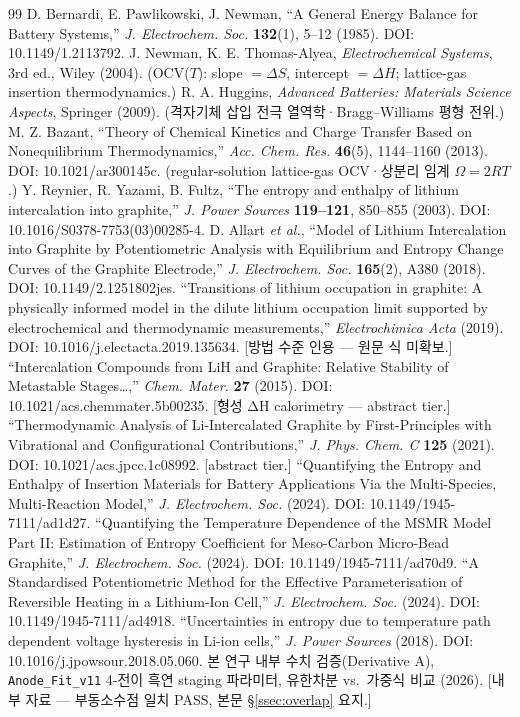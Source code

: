 \documentclass[11pt,a4paper]{article}
\begin{document}
\begin{thebibliography}{99}
 D. Bernardi, E. Pawlikowski, J. Newman, ``A General Energy Balance for Battery Systems,'' \emph{J. Electrochem. Soc.} \textbf{132}(1), 5--12 (1985). DOI: 10.1149/1.2113792.
 J. Newman, K. E. Thomas-Alyea, \emph{Electrochemical Systems}, 3rd ed., Wiley (2004). (OCV($T$): slope $=\Delta S$, intercept $=\Delta H$; lattice-gas insertion thermodynamics.)
 R. A. Huggins, \emph{Advanced Batteries: Materials Science Aspects}, Springer (2009). (격자기체 삽입 전극 열역학·Bragg--Williams 평형 전위.)
 M. Z. Bazant, ``Theory of Chemical Kinetics and Charge Transfer Based on Nonequilibrium Thermodynamics,'' \emph{Acc. Chem. Res.} \textbf{46}(5), 1144--1160 (2013). DOI: 10.1021/ar300145c. (regular-solution lattice-gas OCV·상분리 임계 $\Omega=2RT$.)
 Y. Reynier, R. Yazami, B. Fultz, ``The entropy and enthalpy of lithium intercalation into graphite,'' \emph{J. Power Sources} \textbf{119--121}, 850--855 (2003). DOI: 10.1016/S0378-7753(03)00285-4.
 D. Allart \emph{et al.}, ``Model of Lithium Intercalation into Graphite by Potentiometric Analysis with Equilibrium and Entropy Change Curves of the Graphite Electrode,'' \emph{J. Electrochem. Soc.} \textbf{165}(2), A380 (2018). DOI: 10.1149/2.1251802jes.
 ``Transitions of lithium occupation in graphite: A physically informed model in the dilute lithium occupation limit supported by electrochemical and thermodynamic measurements,'' \emph{Electrochimica Acta} (2019). DOI: 10.1016/j.electacta.2019.135634. [방법 수준 인용 — 원문 식 미확보.]
 ``Intercalation Compounds from LiH and Graphite: Relative Stability of Metastable Stages\ldots,'' \emph{Chem. Mater.} \textbf{27} (2015). DOI: 10.1021/acs.chemmater.5b00235. [형성 ΔH calorimetry — abstract tier.]
 ``Thermodynamic Analysis of Li-Intercalated Graphite by First-Principles with Vibrational and Configurational Contributions,'' \emph{J. Phys. Chem. C} \textbf{125} (2021). DOI: 10.1021/acs.jpcc.1c08992. [abstract tier.]
 ``Quantifying the Entropy and Enthalpy of Insertion Materials for Battery Applications Via the Multi-Species, Multi-Reaction Model,'' \emph{J. Electrochem. Soc.} (2024). DOI: 10.1149/1945-7111/ad1d27.
 ``Quantifying the Temperature Dependence of the MSMR Model Part II: Estimation of Entropy Coefficient for Meso-Carbon Micro-Bead Graphite,'' \emph{J. Electrochem. Soc.} (2024). DOI: 10.1149/1945-7111/ad70d9.
 ``A Standardised Potentiometric Method for the Effective Parameterisation of Reversible Heating in a Lithium-Ion Cell,'' \emph{J. Electrochem. Soc.} (2024). DOI: 10.1149/1945-7111/ad4918.
 ``Uncertainties in entropy due to temperature path dependent voltage hysteresis in Li-ion cells,'' \emph{J. Power Sources} (2018). DOI: 10.1016/j.jpowsour.2018.05.060.
 본 연구 내부 수치 검증(Derivative A), \texttt{Anode\_Fit\_v11} 4-전이 흑연 staging 파라미터, 유한차분 vs.\ 가중식 비교 (2026). [내부 자료 — 부동소수점 일치 PASS, 본문 \S\ref{ssec:overlap} 요지.]
\end{thebibliography}
\end{document}
